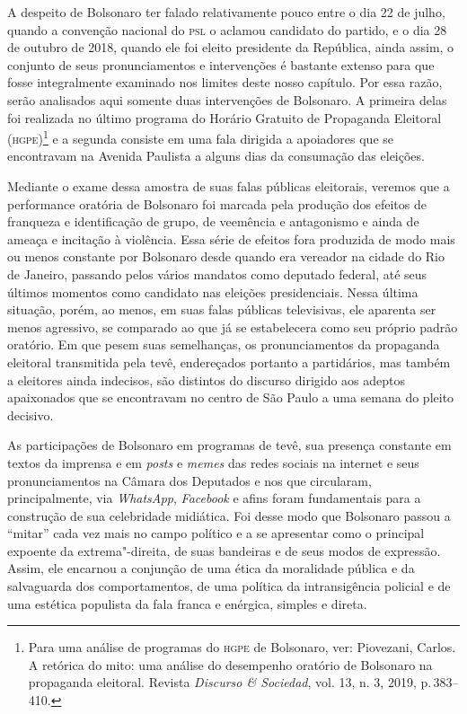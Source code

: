 A despeito de Bolsonaro ter falado relativamente pouco entre o dia 22 de
julho, quando a convenção nacional do \textsc{psl} o aclamou candidato do
partido, e o dia 28 de outubro de 2018, quando ele foi eleito presidente
da República, ainda assim, o conjunto de seus pronunciamentos e
intervenções é bastante extenso para que fosse integralmente examinado
nos limites deste nosso capítulo. Por essa razão, serão analisados aqui
somente duas intervenções de Bolsonaro. A primeira delas foi realizada
no último programa do Horário Gratuito de Propaganda Eleitoral
(\textsc{hgpe})\footnote{Para uma análise de programas do \textsc{hgpe} de Bolsonaro, ver: Piovezani, Carlos. A retórica do mito: uma análise do desempenho
  oratório de Bolsonaro na propaganda eleitoral. Revista \emph{Discurso
  \& Sociedad}, vol. 13, n. 3, 2019, p.\,383--410.} e a segunda consiste
em uma fala dirigida a apoiadores que se encontravam na Avenida Paulista
a alguns dias da consumação das eleições.

Mediante o exame dessa amostra de suas falas públicas eleitorais,
veremos que a performance oratória de Bolsonaro foi marcada pela
produção dos efeitos de franqueza e identificação de grupo, de veemência
e antagonismo e ainda de ameaça e incitação à violência. Essa série de
efeitos fora produzida de modo mais ou menos constante por Bolsonaro
desde quando era vereador na cidade do Rio de Janeiro, passando pelos
vários mandatos como deputado federal, até seus últimos momentos como
candidato nas eleições presidenciais. Nessa última situação, porém, ao
menos, em suas falas públicas televisivas, ele aparenta ser menos
agressivo, se comparado ao que já se estabelecera como seu próprio
padrão oratório. Em que pesem suas semelhanças, os pronunciamentos da
propaganda eleitoral transmitida pela tevê, endereçados portanto a
partidários, mas também a eleitores ainda indecisos, são distintos do
discurso dirigido aos adeptos apaixonados que se encontravam no centro
de São Paulo a uma semana do pleito decisivo.

As participações de Bolsonaro em programas de tevê, sua presença
constante em textos da imprensa e em \emph{posts} e \emph{memes} das
redes sociais na internet e seus pronunciamentos na Câmara dos Deputados
e nos que circularam, principalmente, via \emph{WhatsApp},
\emph{Facebook} e afins foram fundamentais para a construção de sua
celebridade midiática. Foi desse modo que Bolsonaro passou a ``mitar''
cada vez mais no campo político e a se apresentar como o principal
expoente da extrema"-direita, de suas bandeiras e de seus modos de
expressão. Assim, ele encarnou a conjunção de uma ética da moralidade
pública e da salvaguarda dos comportamentos, de uma política da
intransigência policial e de uma estética populista da fala franca e
enérgica, simples e direta.

